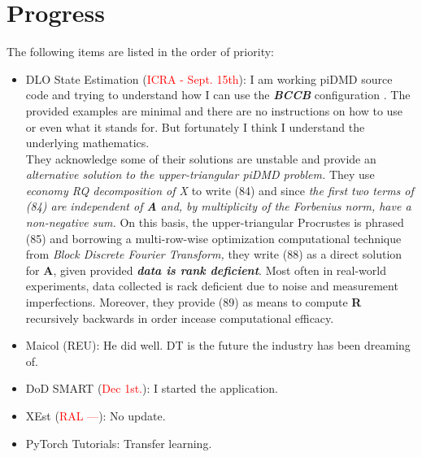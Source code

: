 \documentclass[11pt]{article}
\begin{document}
\section{Progress}
The following items are listed in the order of priority:
\begin{itemize}


    \item DLO State Estimation (\textcolor{red}{ICRA - Sept. 15th}): I am working
    piDMD source code and trying to understand how I can use the \emph{\textbf{BCCB}}
    configuration \cite{baddoo2021physics}. The provided examples are minimal
    and there are no instructions on how to use or even what it stands for.
    But fortunately I think I understand the underlying mathematics.\\
    They acknowledge some of their solutions are unstable and provide an
    \emph{alternative solution to the upper-triangular piDMD problem.} They use
    \emph{economy RQ decomposition of X} to write (84) and since \emph{the first
    two terms of (84) are independent of \textbf{A} and, by multiplicity of the
    Forbenius norm, have a non-negative sum.} On this basis, the
    upper-triangular Procrustes is phrased (85) and borrowing a multi-row-wise
    optimization computational technique from \emph{Block Discrete Fourier
    Transform,} they write (88) as a direct solution for \textbf{A}, given
    provided \emph{\textbf{data is rank deficient}}. Most often in real-world
    experiments, data collected is rack deficient due to noise and measurement
    imperfections. Moreover, they provide (89) as means to compute \textbf{R}
    recursively backwards in order incease computational efficacy.

    \item Maicol (REU): He did well. DT is the future the industry has been dreaming of.
    \item DoD SMART (\textcolor{red}{Dec 1st.}): I started the application.
    \item XEst (\textcolor{red}{RAL ---}): No update.

    \item PyTorch Tutorials: Transfer learning.

  \end{itemize}


\newpage

\newpage


\end{document}
